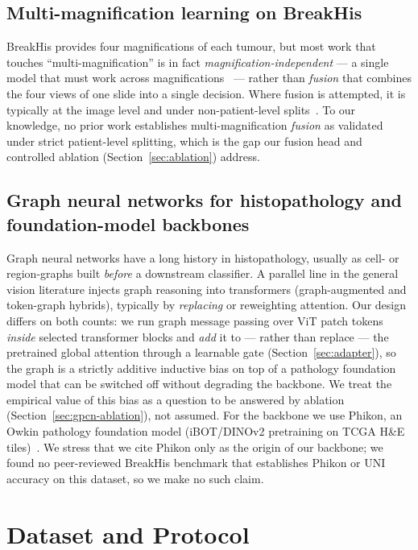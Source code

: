 \documentclass[11pt]{article}
\begin{document}
\subsection{Multi-magnification learning on BreakHis}
BreakHis provides four magnifications of each tumour, but most work that touches
``multi-magnification'' is in fact \emph{magnification-independent} — a single model
that must work across magnifications~\citep{magindep2024vit} — rather than
\emph{fusion} that combines the four views of one slide into a single decision.
Where fusion is attempted, it is typically at the image level and under
non-patient-level splits~\citep{lwtmpcnn2026}. To our knowledge, no prior work
establishes multi-magnification \emph{fusion} as validated under strict
patient-level splitting, which is the gap our fusion head and controlled ablation
(Section~\ref{sec:ablation}) address.

\subsection{Graph neural networks for histopathology and foundation-model backbones}
Graph neural networks have a long history in histopathology, usually as cell- or
region-graphs built \emph{before} a downstream classifier. A parallel line in the
general vision literature injects graph reasoning into transformers (graph-augmented
and token-graph hybrids), typically by \emph{replacing} or reweighting attention.
Our design differs on both counts: we run graph message passing over ViT patch
tokens \emph{inside} selected transformer blocks and \emph{add} it to — rather than
replace — the pretrained global attention through a learnable gate
(Section~\ref{sec:adapter}), so the graph is a strictly additive inductive bias on
top of a pathology foundation model that can be switched off without degrading the
backbone. We treat the empirical value of this bias as a question to be answered by
ablation (Section~\ref{sec:gpcn-ablation}), not assumed. For the backbone we use Phikon, an Owkin pathology
foundation model (iBOT/DINOv2 pretraining on TCGA H\&E
tiles)~\citep{filiot2024phikonv2}. We stress that we cite Phikon only as the origin
of our backbone; we found no peer-reviewed BreakHis benchmark that establishes
Phikon or UNI accuracy on this dataset, so we make no such claim.

\section{Dataset and Protocol}
\label{sec:data}
\end{document}
